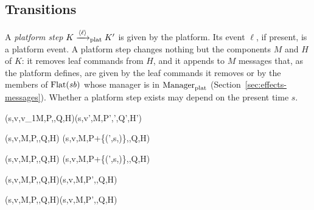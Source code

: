 \subsection{Transitions}\label{sec:programs-transitions}

A \emph{platform step} $K\xrightarrow{\langle \ell\rangle}_{\mathrm{plat}}K'$ is given by the platform.
Its event $\ell$, if present, is a platform event. A platform step changes
nothing but the components $M$ and $H$ of $K$: it removes leaf commands from
$H$, and it appends to $M$ messages that, as the platform defines, are given
by the leaf commands it removes or by the members of $\mathrm{Flat}(\mathit{sb})$ whose
manager is in $\mathrm{Manager}_{\mathrm{plat}}$ (Section~\ref{sec:effects-messages}). Whether a
platform step exists may depend on the present time $s$. %


  {(s,v,v_1\cdot M,P,\sbv,Q,H)\step{}(s,v',M,P',\sbv',Q',H')}

  {(s,v,M,P,\sbv,Q,H)\step{\opt{\effa}}
   (s,v,M,P+\{\pid\mapsto(\tk',s,\pgorig)\},\sbv,Q,H)}

  {(s,v,M,P,\sbv,Q,H)\step{\effa}
   (s,v,M,P+\{\pid\mapsto(\tk',s,\pgorig)\},\sbv,Q,H)}

  {(s,v,M,P,\sbv,Q,H)\step{\effa}(s,v,M,P',\sbv,Q,H)}

  {(s,v,M,P,\sbv,Q,H)\step{\effa}(s,v,M,P',\sbv,Q,H)}

